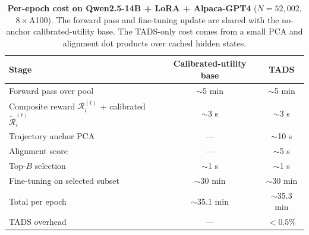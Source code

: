 \begin{table}[t]
\centering
\caption{\textbf{Per-epoch cost on Qwen2.5-14B + LoRA + Alpaca-GPT4}
($N=52{,}002$, $8\times$A100). The forward pass and fine-tuning
update are shared with the no-anchor calibrated-utility base. The
\textsc{TADS}-only cost comes from a small PCA and alignment dot
products over cached hidden states.}
\label{tab:cost-14b-main}
\small
\begin{tabular}{lcc}
\toprule
Stage & Calibrated-utility base & \textsc{TADS} \\
\midrule
Forward pass over pool          & $\sim$5 min  & $\sim$5 min  \\
Composite reward $\mathcal{R}_i^{(t)}$ +
  calibrated $\tilde{\mathcal{R}}_i^{(t)}$
                                & $\sim$3 s    & $\sim$3 s    \\
Trajectory anchor PCA           & ---          & $\sim$10 s   \\
Alignment score                 & ---          & $\sim$5 s    \\
Top-$B$ selection                & $\sim$1 s    & $\sim$1 s    \\
Fine-tuning on selected subset   & $\sim$30 min & $\sim$30 min \\
\midrule
Total per epoch                  & $\sim$35.1 min & $\sim$35.3 min \\
\textsc{TADS} overhead           & ---          & $<0.5\%$     \\
\bottomrule
\end{tabular}
\end{table}
